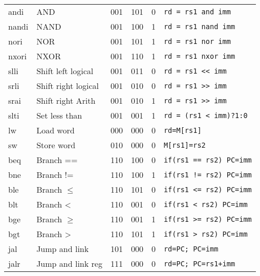 \documentclass[a4paper]{article}
\begin{document}
\begin{tabular}{|l|l|c|c|c|l|}
        andi  & AND                  & 001    & 101    & 0      & \texttt{rd = rs1 and imm}   \\
        nandi & NAND                 & 001    & 100    & 1      & \texttt{rd = rs1 nand imm}    \\
        nori  & NOR                  & 001    & 101    & 1      & \texttt{rd = rs1 nor imm}     \\
        nxori & NXOR                 & 001    & 110    & 1      & \texttt{rd = rs1 nxor imm}    \\
        slli  & Shift left logical   & 001    & 011    & 0      & \texttt{rd = rs1 << imm}      \\
        srli  & Shift right logical  & 001    & 010    & 0      & \texttt{rd = rs1 >> imm}      \\
        srai  & Shift right Arith    & 001    & 010    & 1      & \texttt{rd = rs1 >> imm}      \\
        slti  & Set less than        & 001    & 001    & 1      & \texttt{rd = (rs1 < imm)?1:0} \\
        \hline
        lw    & Load word            & 000    & 000    & 0      & \texttt{rd=M[rs1]}            \\
        sw    & Store word           & 010    & 000    & 0      & \texttt{M[rs1]=rs2}           \\
        \hline
        beq   & Branch ==            & 110    & 100    & 0      & \texttt{if(rs1 == rs2) PC=imm}\\
        bne   & Branch !=            & 110    & 100    & 1      & \texttt{if(rs1 != rs2) PC=imm}\\
        ble   & Branch \(\leqslant\) & 110    & 101    & 0      & \texttt{if(rs1 <= rs2) PC=imm}\\
        blt   & Branch <             & 110    & 001    & 0      & \texttt{if(rs1 < rs2) PC=imm} \\
        bge   & Branch \(\geqslant\) & 110    & 001    & 1      & \texttt{if(rs1 >= rs2) PC=imm}\\
        bgt   & Branch >             & 110    & 101    & 1      & \texttt{if(rs1 > rs2) PC=imm} \\

        \hline
        jal  & Jump and link        & 101    & 000    & 0      &\texttt{rd=PC; PC=imm}         \\
        jalr & Jump and link reg    & 111    & 000    & 0      &\texttt{rd=PC; PC=rs1+imm}     \\
        \hline
    \end{tabular}
    
\end{document}
